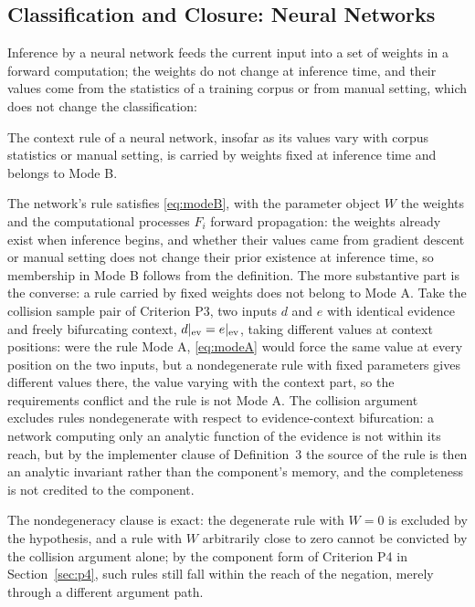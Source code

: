 \subsection{Classification and Closure: Neural Networks}

Inference by a neural network feeds the current input into a set of weights in a forward computation; the weights do not change at inference time, and their values come from the statistics of a training corpus or from manual setting, which does not change the classification:

\begin{proposition}
The context rule of a neural network, insofar as its values vary with corpus statistics or manual setting, is carried by weights fixed at inference time and belongs to Mode B.
\end{proposition}

\argument The network's rule satisfies \eqref{eq:modeB}, with the parameter object $W$ the weights and the computational processes $F_i$ forward propagation: the weights already exist when inference begins, and whether their values came from gradient descent or manual setting does not change their prior existence at inference time, so membership in Mode B follows from the definition. The more substantive part is the converse: a rule carried by fixed weights does not belong to Mode A. Take the collision sample pair of Criterion P3, two inputs $d$ and $e$ with identical evidence and freely bifurcating context, $d|_{\mathrm{ev}} = e|_{\mathrm{ev}}$, taking different values at context positions: were the rule Mode A, \eqref{eq:modeA} would force the same value at every position on the two inputs, but a nondegenerate rule with fixed parameters gives different values there, the value varying with the context part, so the requirements conflict and the rule is not Mode A. The collision argument excludes rules nondegenerate with respect to evidence-context bifurcation: a network computing only an analytic function of the evidence is not within its reach, but by the implementer clause of Definition~3 the source of the rule is then an analytic invariant rather than the component's memory, and the completeness is not credited to the component.\qedbox

The nondegeneracy clause is exact: the degenerate rule with $W = 0$ is excluded by the hypothesis, and a rule with $W$ arbitrarily close to zero cannot be convicted by the collision argument alone; by the component form of Criterion P4 in Section~\ref{sec:p4}, such rules still fall within the reach of the negation, merely through a different argument path.

